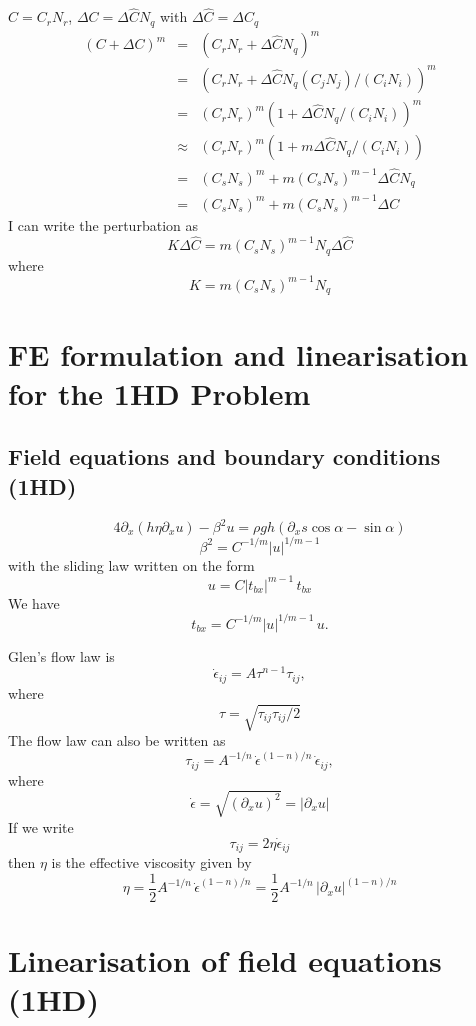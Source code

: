 \documentclass[10pt,a4paper]{book}
\newcommand{\p}{\partial}
\newcommand{\eps}{\dot{\epsilon}}
\newcommand{\eij}{\dot{\epsilon}_{ij}}
\newcommand{\tbx}{t_{bx}}
\begin{document}
$ C= C_r N_r$, $\Delta C= \Delta \hat{C} N_q$ with $\Delta \hat{C}=\Delta C_q$
\begin{eqnarray*}
 (C+\Delta C )^m           &=&  (C_r N_r + \Delta \hat{C}  N_q)^m \\
                           &=&  (C_r N_r + \Delta \hat{C}  N_q (C_j N_j)/( C_i N_i))^m  \\
                           &=&  (C_r N_r )^m (1+ \Delta \hat{C} N_q /(C_i N_i))^m  \\
                           &\approx& (C_r N_r )^m (1+ m \Delta \hat{C} N_q /(C_i N_i))  \\
                           &=& (C_s N_s )^m + m (C_s N_s )^{m-1} \Delta \hat{C} N_q  \\
                           &=& (C_s N_s )^m + m (C_s N_s )^{m-1} \Delta C
\end{eqnarray*}
I can write the perturbation as
\[  
K \Delta \hat{C}= m (C_s N_s )^{m-1} N_q \Delta \hat{C}
\]
where 
\[
K = m (C_s N_s )^{m-1} N_q
\]

\section{FE formulation and linearisation for the 1HD Problem}

\subsection{Field equations and boundary conditions (1HD)}



\[
4 \p_x (h \eta \p_x u) -\beta^2 u = \rho g h (\p_x s \cos \alpha  -  \sin \alpha )
\]
\[
\beta^2=C^{-1/m} |u|^{1/m-1} 
\]
with the sliding law written on the form
\[
u= C | \tbx|^{m-1} \, \tbx
\]
We have
\[
\tbx=C^{-1/m} | u|^{1/m-1} \, u .
\] 


Glen's flow law is 
\[
\eij=A \tau^{n-1} \tau_{ij},
\]
where  
\[
\tau=\sqrt{\tau_{ij} \tau_{ij}/2}
\]
The flow law can also be written as
\[
\tau_{ij}=A^{-1/n} \,\dot{\epsilon}^{(1-n)/n}\, \dot{\epsilon}_{ij},
\]
where
\[ 
\eps=\sqrt{ (\p_{x} u)^2 }= | \p_x u |
\]
If we write
\[
\tau_{ij}= 2 \eta \eij
\]
then $\eta$ is the effective viscosity given by
\[
\eta=\frac{1}{2} A^{-1/n} \,\dot{\epsilon}^{(1-n)/n} =\frac{1}{2} A^{-1/n} \,| \p_x u |^{(1-n)/n}
\]




\section{Linearisation of field equations (1HD)}
\end{document}

